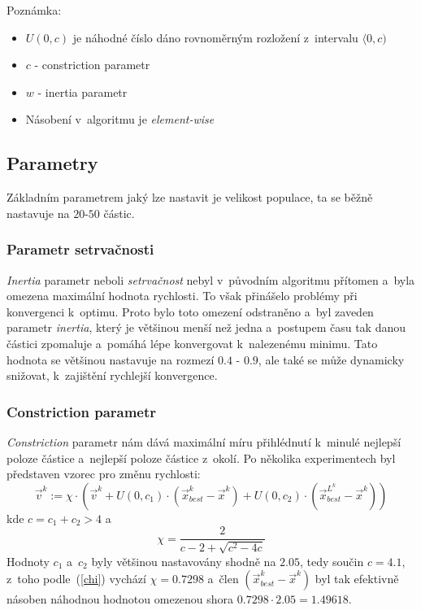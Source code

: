 \documentclass[12pt,a4paper,fleqn]{article}
\begin{document}
Poznámka:
\begin{itemize}
\item $U(0,c)$ je náhodné číslo dáno rovnoměrným rozložení z~intervalu $\langle 0, c)$
\item $c$ - constriction parametr
\item $w$ - inertia parametr
\item Násobení v~algoritmu je \textit{element-wise}
\end{itemize}

\subsection{Parametry}
Základním parametrem jaký lze nastavit je velikost populace, ta se běžně nastavuje na $20$-$50$ částic.

\subsubsection{Parametr setrvačnosti}
\textit{Inertia} parametr neboli \textit{setrvačnost} nebyl v~původním algoritmu přítomen a~byla omezena maximální hodnota rychlosti. To však přinášelo problémy při konvergenci k~optimu. Proto bylo toto omezení odstraněno a~byl zaveden parametr 
\textit{inertia}, který je většinou menší než jedna a~postupem času tak danou částici zpomaluje a~pomáhá lépe konvergovat k~nalezenému minimu. Tato hodnota se většinou nastavuje na rozmezí $0.4$ - $0.9$, ale také se může dynamicky snižovat, k~zajištění rychlejší konvergence.


\subsubsection{Constriction parametr}
\textit{Constriction} parametr nám dává maximální míru přihlédnutí k~minulé nejlepší poloze částice a~nejlepší poloze částice z~okolí. Po několika experimentech byl představen vzorec pro změnu rychlosti:
\begin{equation} \label{v-chi}
\vec{v}^k :=  \chi \cdot \left(\vec{v}^k + U(0,c_1) \cdot (\vec{x}^k_{best} - \vec{x}^k) + U(0,c_2) \cdot (\vec{x}^{L^k}_{best} -  \vec{x}^k) \right)
\end{equation}
kde $c = c_1 + c_2 > 4$
a~\begin{equation} \label{chi}
\chi = \frac{2}{c - 2 + \sqrt{c^2 - 4 c}}
\end{equation}
Hodnoty $c_1$ a~$c_2$ byly většinou nastavovány shodně na $2.05$, tedy součin $c = 4.1$, z~toho podle~(\ref{chi}) vychází $\chi = 0.7298$ a~člen $(\vec{x}^k_{best} - \vec{x}^k)$ byl tak efektivně násoben náhodnou hodnotou omezenou shora $0.7298 \cdot 2.05 = 1.49618$.
\end{document}
